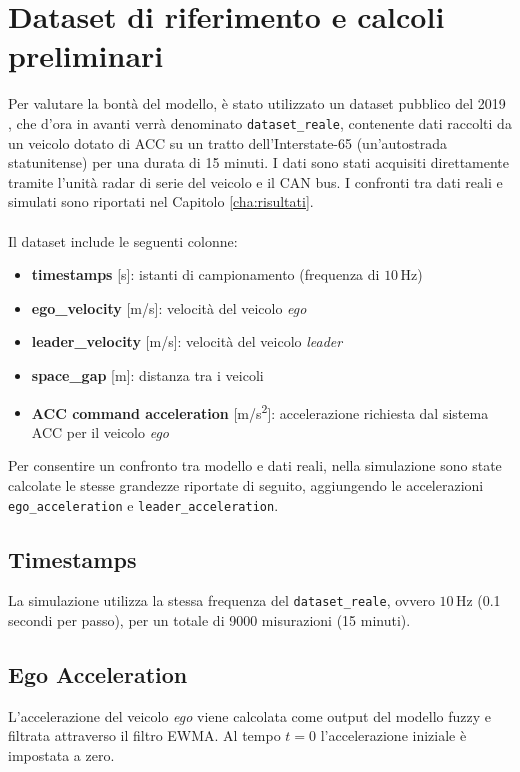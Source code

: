 \section{Dataset di riferimento e calcoli preliminari}
Per valutare la bontà del modello, è stato utilizzato un dataset pubblico del 2019 \cite{wang2019acc_dataset}, che d'ora in avanti
verrà denominato \texttt{dataset\_reale}, contenente dati raccolti da un veicolo dotato di ACC su un tratto dell'Interstate-65 
(un'autostrada statunitense) per una durata di 15 minuti.  
I dati sono stati acquisiti direttamente tramite l'unità radar di serie del veicolo e il CAN bus.  
I confronti tra dati reali e simulati sono riportati nel Capitolo \ref{cha:risultati}.
\\\\
\noindent Il dataset include le seguenti colonne:
\begin{itemize}
    \item \textbf{timestamps} [s]: istanti di campionamento (frequenza di $10\,\mathrm{Hz}$)
    \item \textbf{ego\_velocity} [m/s]: velocità del veicolo \emph{ego}
    \item \textbf{leader\_velocity} [m/s]: velocità del veicolo \emph{leader}
    \item \textbf{space\_gap} [m]: distanza tra i veicoli
    \item \textbf{ACC command acceleration} [m/s\textsuperscript{2}]: accelerazione richiesta dal sistema ACC per il veicolo \emph{ego}
\end{itemize}

\noindent Per consentire un confronto tra modello e dati reali, nella simulazione sono state calcolate le stesse grandezze riportate di
seguito, aggiungendo le accelerazioni \texttt{ego\_acceleration} e \texttt{leader\_acceleration}.

\subsection{Timestamps}
La simulazione utilizza la stessa frequenza del \texttt{dataset\_reale}, 
ovvero $10\,\mathrm{Hz}$ (0.1 secondi per passo), per un totale di 9000 misurazioni (15 minuti).

\subsection{Ego Acceleration}
L'accelerazione del veicolo \emph{ego} viene calcolata come output del modello fuzzy e filtrata attraverso il filtro EWMA.  
Al tempo $t=0$ l'accelerazione iniziale è impostata a zero.

